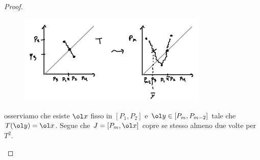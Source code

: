 \begin{proof}
\begin{enumerate}
\begin{figure}[!htb]
	\centering
	\includegraphics[width=9cm]{Immagini/Ferro_di_cavallo_2.png}
\end{figure}

osserviamo che esiste $\ol x$ fisso in $[P_1,P_2]$ e $\ol y\in [P_{m},P_{m-2}]$ tale che $T(\ol y)=\ol x$. Segue che $J=[P_m,\ol x]$ copre se stesso almeno due volte per $T^2$.
\end{enumerate}
\setlength{\leftmargini}{0.5cm}
\end{proof}



